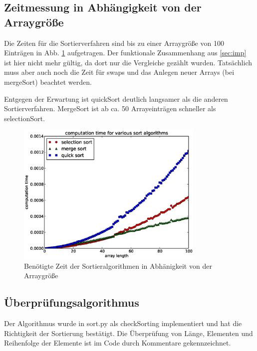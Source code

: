 \documentclass{article}
\begin{document}
\clearpage
\subsection{Zeitmessung in Abhängigkeit von der Arraygröße}

Die Zeiten für die Sortierverfahren sind bis zu einer Arraygröße von 100 Einträgen in Abb. \ref{fig:time} aufgetragen. Der funktionale Zusammenhang aus \ref{sec:imp} ist hier nicht mehr gültig, da dort nur die Vergleiche gezählt wurden. Tatsächlich muss aber auch noch die Zeit für swaps und das Anlegen neuer Arrays (bei mergeSort) beachtet werden.

Entgegen der Erwartung ist quickSort deutlich langsamer als die anderen Sortierverfahren. MergeSort ist ab ca. 50 Arrayeinträgen schneller als selectionSort.

\begin{figure}[h]
\centering
\includegraphics[width=0.8\textwidth]{time_100.eps}

\caption{Benötigte Zeit der Sortieralgorithmen in Abhänigkeit von der Arraygröße}
\label{fig:time}
\end{figure}

\clearpage
\subsection{Überprüfungsalgorithmus}

Der Algorithmus wurde in sort.py als checkSorting implementiert und hat die Richtigkeit der Sortierung bestätigt. Die Überprüfung von Länge, Elementen und Reihenfolge der Elemente ist im Code durch Kommentare gekennzeichnet.
\end{document}
